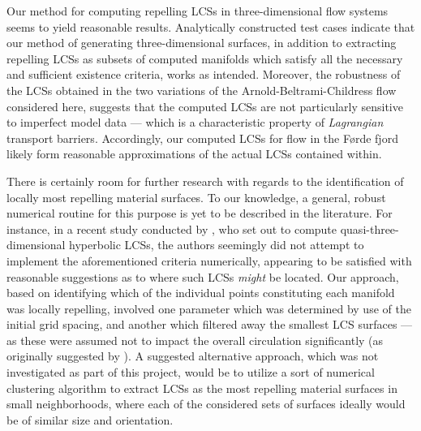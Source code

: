 Our method for computing repelling LCSs in three-dimensional flow systems
seems to yield reasonable results. Analytically constructed test cases indicate
that our method of generating three-dimensional surfaces, in addition to
extracting repelling LCSs as subsets of computed manifolds which satisfy all
the necessary and sufficient existence criteria, works as intended. Moreover,
the robustness of the LCSs obtained in the two variations of the
Arnold-Beltrami-Childress flow considered here, suggests that the computed LCSs
are not particularly sensitive to imperfect model data --- which is a
characteristic property of \emph{Lagrangian} transport barriers. Accordingly,
our computed LCSs for flow in the Førde fjord likely form reasonable
approximations of the actual LCSs contained within.

There is certainly room for further research with regards to the identification
of locally most repelling material surfaces. To our knowledge, a general,
robust numerical routine for this purpose is yet to be described in the
literature. For instance, in a recent study conducted by
\textcite{oettinger2016autonomous}, who set out to compute
quasi-three-dimensional hyperbolic LCSs, the authors seemingly did not attempt
to implement the aforementioned criteria numerically, appearing to be satisfied
with reasonable suggestions as to where such LCSs \emph{might} be located. Our
approach, based on identifying which of the individual points constituting each
manifold was locally repelling, involved one parameter which was determined by
use of the  initial grid spacing, and another which filtered away the smallest
LCS  surfaces --- as these were assumed not to impact the overall circulation
significantly (as originally suggested by \textcite{farazmand2012computing}).
A suggested alternative approach, which was not investigated as part of this
project, would be to utilize a sort of numerical clustering algorithm to
extract LCSs as the most repelling material surfaces in small neighborhoods,
where each of the considered sets of surfaces ideally would be of similar size
and orientation.

